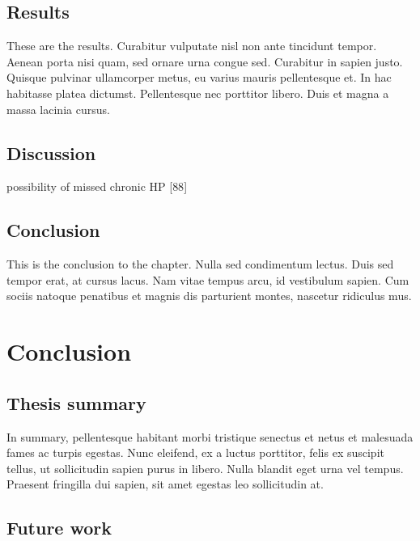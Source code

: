 \documentclass[12pt,a4paper,]{report}
\begin{document}
\hypertarget{results-4}{%
\section{Results}\label{results-4}}

These are the results. Curabitur vulputate nisl non ante tincidunt
tempor. Aenean porta nisi quam, sed ornare urna congue sed. Curabitur in
sapien justo. Quisque pulvinar ullamcorper metus, eu varius mauris
pellentesque et. In hac habitasse platea dictumst. Pellentesque nec
porttitor libero. Duis et magna a massa lacinia cursus.

\hypertarget{discussion-4}{%
\section{Discussion}\label{discussion-4}}

possibility of missed chronic HP {[}88{]}

\hypertarget{conclusion-4}{%
\section{Conclusion}\label{conclusion-4}}

This is the conclusion to the chapter. Nulla sed condimentum lectus.
Duis sed tempor erat, at cursus lacus. Nam vitae tempus arcu, id
vestibulum sapien. Cum sociis natoque penatibus et magnis dis parturient
montes, nascetur ridiculus mus.

\hypertarget{conclusion-5}{%
\chapter{Conclusion}\label{conclusion-5}}

\hypertarget{thesis-summary}{%
\section{Thesis summary}\label{thesis-summary}}

In summary, pellentesque habitant morbi tristique senectus et netus et
malesuada fames ac turpis egestas. Nunc eleifend, ex a luctus porttitor,
felis ex suscipit tellus, ut sollicitudin sapien purus in libero. Nulla
blandit eget urna vel tempus. Praesent fringilla dui sapien, sit amet
egestas leo sollicitudin at.

\hypertarget{future-work}{%
\section{Future work}\label{future-work}}
\end{document}
